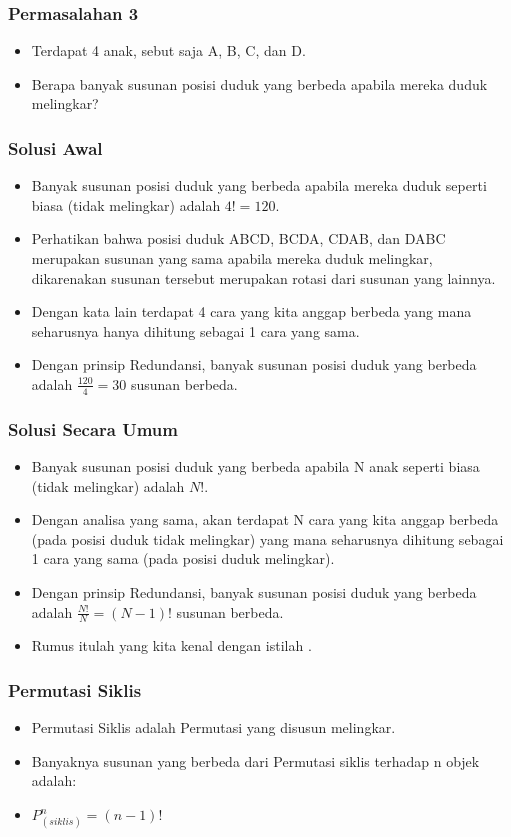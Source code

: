 \begin{frame}
\frametitle{Permasalahan 3}
\begin{itemize}
  \item Terdapat 4 anak, sebut saja A, B, C, dan D.
  \item Berapa banyak susunan posisi duduk yang berbeda apabila mereka duduk melingkar?
\end{itemize}
\end{frame}

\begin{frame}
\frametitle{Solusi Awal}
\begin{itemize}
  \item Banyak susunan posisi duduk yang berbeda apabila mereka duduk seperti biasa (tidak melingkar) adalah $4! = 120$.
  \item Perhatikan bahwa posisi duduk ABCD, BCDA, CDAB, dan DABC merupakan susunan yang sama apabila mereka duduk melingkar, dikarenakan susunan tersebut merupakan rotasi dari susunan yang lainnya.
  \item Dengan kata lain terdapat 4 cara yang kita anggap berbeda yang mana seharusnya hanya dihitung sebagai 1 cara yang sama.
  \item Dengan prinsip Redundansi, banyak susunan posisi duduk yang berbeda adalah $\frac{120}{4} = 30$ susunan berbeda.
\end{itemize}
\end{frame}


\begin{frame}
\frametitle{Solusi Secara Umum}
\begin{itemize}
  \item Banyak susunan posisi duduk yang berbeda apabila N anak seperti biasa (tidak melingkar) adalah $N!$.
  \item Dengan analisa yang sama, akan terdapat N cara yang kita anggap berbeda (pada posisi duduk tidak melingkar) yang mana seharusnya dihitung sebagai 1 cara yang sama (pada posisi duduk melingkar).
  \item Dengan prinsip Redundansi, banyak susunan posisi duduk yang berbeda adalah $\frac{N!}{N} = (N-1)!$ susunan berbeda.
  \item Rumus itulah yang kita kenal dengan istilah .
\end{itemize}
\end{frame}

\begin{frame}
\frametitle{Permutasi Siklis}
\begin{itemize}
  \item Permutasi Siklis adalah Permutasi yang disusun melingkar.
  \item Banyaknya susunan yang berbeda dari Permutasi siklis terhadap n objek adalah:
  \item $P^{n}_{(siklis)} = (n-1)!$
\end{itemize}
\end{frame}

